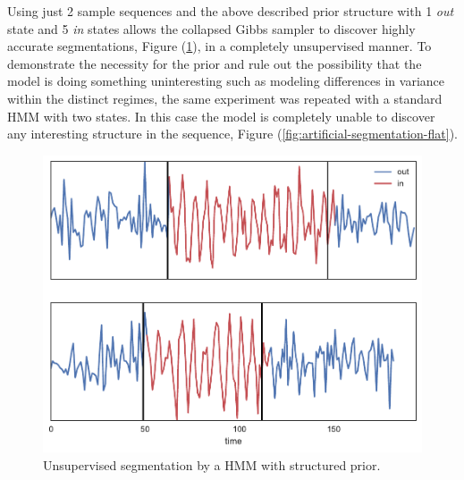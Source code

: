 \documentclass[12pt]{report}
\newcommand{\1}[0]{\mathbbm{1}}
\begin{document}
Using just 2 sample sequences and the above described prior structure with
1 \emph{out} state and 5 \emph{in} states allows the collapsed Gibbs sampler
to discover highly accurate segmentations, Figure (\ref{fig:artificial-segmentation-struct}),
in a completely unsupervised manner. To demonstrate the necessity for the prior
and rule out the possibility that the model is doing something uninteresting such
as modeling differences in variance within the distinct regimes, the same experiment
was repeated with a standard \ac{HMM} with two states. In this case the model is completely
unable to discover any interesting structure in the sequence, 
Figure (\ref{fig:artificial-segmentation-flat}).

\begin{figure}[H]
    \centering
    \includegraphics[width=1\textwidth]{img/artificial-segment-output-struct.pdf}
    \caption{Unsupervised segmentation by a \ac{HMM} with structured prior.}
    \label{fig:artificial-segmentation-struct}
\end{figure}
\end{document}
